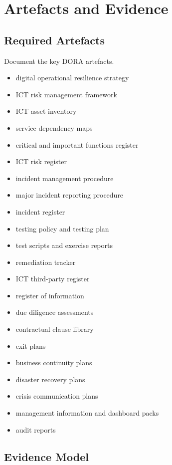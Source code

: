 \documentclass[
  letterpaper,
  DIV=11,
  numbers=noendperiod]{scrartcl}
\providecommand{\tightlist}{%
  \setlength{\itemsep}{0pt}\setlength{\parskip}{0pt}}
\begin{document}
\section{Artefacts and Evidence}\label{artefacts-and-evidence}

\subsection{Required Artefacts}\label{required-artefacts}

Document the key DORA artefacts.

\begin{itemize}
\tightlist
\item
  digital operational resilience strategy
\item
  ICT risk management framework
\item
  ICT asset inventory
\item
  service dependency maps
\item
  critical and important functions register
\item
  ICT risk register
\item
  incident management procedure
\item
  major incident reporting procedure
\item
  incident register
\item
  testing policy and testing plan
\item
  test scripts and exercise reports
\item
  remediation tracker
\item
  ICT third-party register
\item
  register of information
\item
  due diligence assessments
\item
  contractual clause library
\item
  exit plans
\item
  business continuity plans
\item
  disaster recovery plans
\item
  crisis communication plans
\item
  management information and dashboard packs
\item
  audit reports
\end{itemize}

\subsection{Evidence Model}\label{evidence-model}
\end{document}
